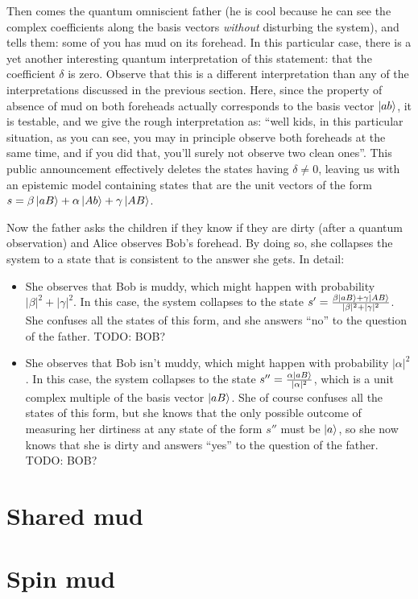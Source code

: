 \documentclass[a4paper]{article}
\begin{document}
Then comes the quantum omniscient father (he is cool because he can see the
complex coefficients along the basis vectors \emph{without} disturbing the
system), and tells them: some of you has mud on its forehead. In this particular
case, there is a yet another interesting quantum interpretation of this statement:
that the coefficient $\delta$ is zero. Observe that this is a different
interpretation than any of the interpretations discussed in the previous
section. Here, since the property of absence of mud on both foreheads actually
corresponds to the basis vector $\ket{ab}$, it is testable, and we give the
rough interpretation as: ``well kids, in this particular situation, as you can
see, you may in principle observe both foreheads at the same time, and if you
did that, you'll surely not observe two clean ones''. This public announcement
effectively deletes the states having $\delta \neq 0$, leaving us with an
epistemic model containing states that are the unit vectors of the form 
$s = \beta \ket{aB} + \alpha \ket{Ab} + \gamma \ket{AB}$.

Now the father asks the children if they know if they are dirty (after a quantum
observation) and Alice observes Bob's forehead. By doing so, she collapses the
system to a state that is consistent to the answer she gets. In detail:
\begin{itemize}
    \item She observes that Bob is muddy, which might happen with probability 
        $|\beta|^2 + |\gamma|^2$. In this case, the system  collapses to the state
        $s' = \frac{\beta \ket{aB} + \gamma \ket{AB}}{|\beta|^2 + |\gamma|^2}$.
        She confuses all the states of this form, and she answers ``no'' to the
        question of the father. TODO: BOB?
    \item She observes that Bob isn't muddy, which might happen with probability
        $|\alpha|^2$. In this case, the system collapses to the state $s'' =
        \frac{\alpha \ket{aB}}{|\alpha|^2}$, which is a unit complex multiple of
        the basis vector $\ket{aB}$. She of course confuses all the states of
        this form, but she knows that the only possible outcome of measuring her
        dirtiness at any state of the form $s''$ must be $\ket{a}$, so she now
        knows that she is dirty and answers ``yes'' to the question of the
        father. TODO: BOB?
\end{itemize}
\section*{Shared mud}

\section*{Spin mud}
\end{document}
